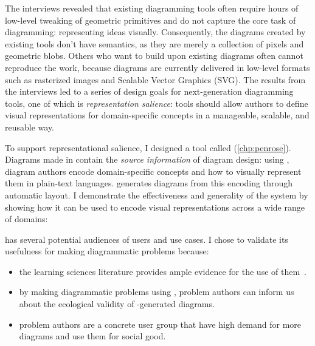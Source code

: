\noindent The interviews revealed that existing diagramming tools often require hours of low-level tweaking of geometric primitives and do not capture the core task of diagramming: representing ideas visually. Consequently, the diagrams created by existing tools don't have semantics, as they are merely a collection of pixels and geometric blobs. Others who want to build upon existing diagrams often cannot reproduce the work, because diagrams are currently delivered in low-level formats such as rasterized images and Scalable Vector Graphics (SVG). The results from the interviews led to a series of design goals for next-generation diagramming tools, one of which is \textit{representation salience}: tools should allow authors to define visual representations for domain-specific concepts in a manageable, scalable, and reusable way. 

To support representational salience, I designed a tool called \Penrose (\cref{chp:penrose}). Diagrams made in \Penrose contain the \emph{source information} of diagram design: using \Penrose, diagram authors encode domain-specific concepts and how to visually represent them in plain-text languages. \Penrose generates diagrams from this encoding through automatic layout. I demonstrate the effectiveness and generality of the system by showing how it can be used to encode visual representations across a wide range of domains:

\label{rq:expressiveness}

\Penrose has several potential audiences of users and use cases. I chose to validate its usefulness for making diagrammatic problems because:

\begin{itemize}
    \item the learning sciences literature provides ample evidence for the use of them~\cite{multipleReps, mayer_multimedia_2002, blum_combining_1998}.
    \item by making diagrammatic problems using \Penrose, problem authors can inform us about the ecological validity of \Penrose-generated diagrams.
    \item problem authors are a concrete user group that have high demand for more diagrams and use them for social good.
\end{itemize}

